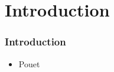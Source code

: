 \section{Introduction}
	\begin{frame}
		\frametitle{Introduction}
   		\begin{itemize}
    		\item Pouet
    	\end{itemize}
	\end{frame}